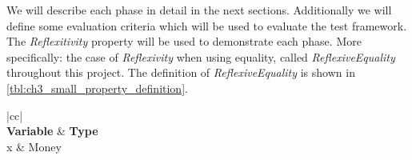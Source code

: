 We will describe each phase in detail in the next sections. Additionally we will define some evaluation criteria which will be used to evaluate the test framework. The \textit{Reflexitivity} property will be used to demonstrate each phase. More specifically: the case of \textit{Reflexivity} when using equality, called \textit{ReflexiveEquality} throughout this project. The definition of \textit{ReflexiveEquality} is shown in \autoref{tbl:ch3_small_property_definition}.
\FloatBarrier
\begin{table}[h!]
\centering
\begin{tabular}{|cc|}
\hline
{} \\ \hline
\textbf{Variable} & \textbf{Type} \\ \hline
x & Money \\ \hline
\end{tabular}
\caption{A property definition of \textit{Reflexivity} when using equality}
\label{tbl:ch3_small_property_definition}
\end{table}
\FloatBarrier

